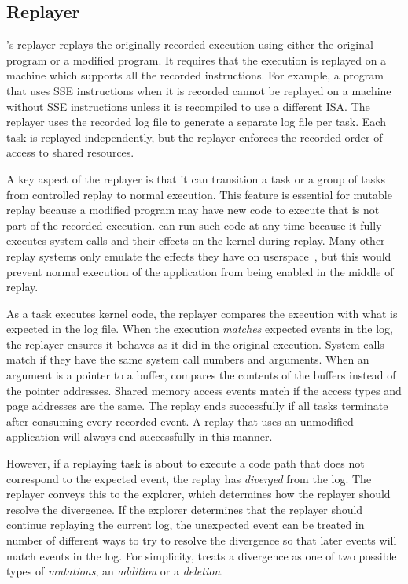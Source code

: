 \subsection{Replayer}
\label{sec:replayer}

{\dora}'s replayer replays the originally
recorded execution using either the original program or a modified
program. It requires that the execution is replayed on a machine which
supports all the recorded instructions. For example, a program that
uses SSE instructions when it is recorded cannot be replayed on a
machine without SSE instructions unless it is recompiled to use a different
ISA.  The replayer uses the recorded log file to generate a separate
log file per task.  Each task is replayed independently, but the
replayer enforces the recorded order of access to shared resources.  

A key aspect of the replayer is that it can
transition a task or a group of tasks from controlled replay to normal
execution. This feature is essential for mutable replay because a
modified program may have new code to execute that is not
part of the recorded execution.
{\dora} can run such code at any time because it
fully executes system calls and their effects on the kernel during
replay. Many other replay systems only emulate the effects they have
on userspace~\cite{jockey,r2:osdi}, but this would prevent normal
execution of the application from being enabled in the middle of
replay.

As a task executes kernel code, the replayer compares the execution
with what is expected in the log file.  When the execution
\emph{matches} expected events in the log, the 
replayer ensures it behaves as it did in the original execution.  
System calls match if they have the same system call numbers and
arguments. When an argument is a pointer to a buffer, {\dora}
compares the contents of the buffers instead of the pointer addresses.
Shared memory access events match if the access types and page
addresses are the same.  The replay ends successfully if all tasks
terminate after consuming every recorded event. A replay that uses an
unmodified application will always end successfully in this manner.

However, if a replaying task is about to execute a code path that does
not correspond to the expected event, the replay has \emph{diverged}
from the log.  The replayer conveys this to the explorer, which
determines how the replayer should resolve the divergence.
If the explorer determines that the replayer should continue
replaying the current log, the unexpected event can be treated in
number of different ways to try to resolve the divergence so that
later events will match events in the log.  For simplicity, {\dora}
treats a divergence as one of two possible types of \emph{mutations},
an \emph{addition} or a \emph{deletion}.  

